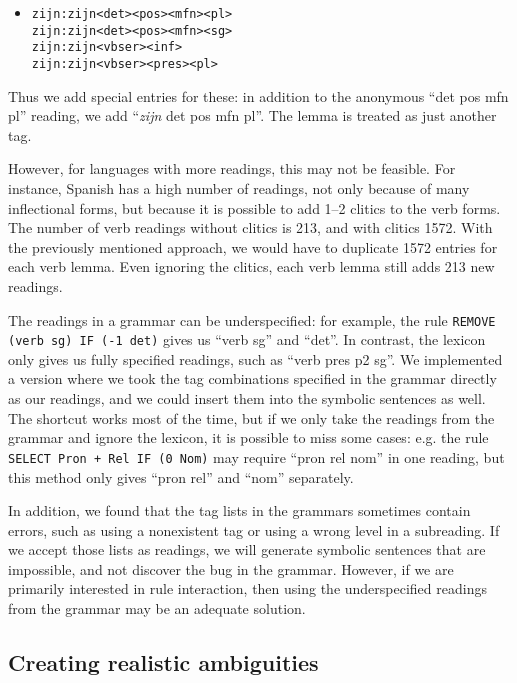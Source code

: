 \begin{itemize}
 \item[] 
\begin{verbatim}zijn:zijn<det><pos><mfn><pl>
zijn:zijn<det><pos><mfn><sg>
zijn:zijn<vbser><inf>
zijn:zijn<vbser><pres><pl>
\end{verbatim}
\end{itemize}

Thus we add special entries for these: in addition to the anonymous
``det pos mfn pl'' reading, we add ``\emph{zijn} det pos mfn pl''. 
The lemma is treated as just another tag.

 However, for languages with more readings, this may not be feasible. For instance, Spanish has a high number of readings, not only because of many inflectional forms, but because it is possible to add 1--2 clitics to the verb forms.
The number of verb readings without clitics is 213, and with clitics 1572.
With the previously mentioned approach, we would have to duplicate 1572 entries for each verb lemma. Even ignoring the clitics, each verb lemma still adds 213 new readings.

The readings in a grammar can be underspecified: for example, the rule
\texttt{REMOVE (verb sg) IF (-1 det)} gives us ``verb sg'' and ``det''.
In contrast, the lexicon only gives us fully specified readings, such
as ``verb pres p2 sg''. We implemented a version where we took
the tag combinations specified in the grammar directly as our
readings, and we could insert them into the symbolic sentences as well.
The shortcut works most of the time, but if we only take the readings
from the grammar and ignore the lexicon, it is possible to
miss some cases: e.g. the rule \texttt{SELECT Pron + Rel IF (0 Nom)} 
may require ``pron rel nom'' in one reading, but this method only gives
``pron rel'' and ``nom'' separately. 

In addition, we found that the tag lists in the grammars sometimes
contain errors, such as using a nonexistent tag or using a wrong level
in a subreading. If we accept those lists as readings, we will
generate symbolic sentences that are impossible, and not discover
the bug in the grammar.
However, if we are primarily interested in rule interaction, then using
the underspecified readings from the grammar may be an adequate solution.



\subsection{Creating realistic ambiguities}





